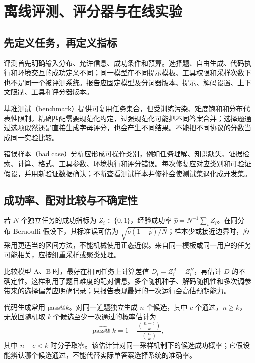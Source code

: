 \setcounter{chapter}{18} %
\chapter{离线评测、评分器与在线实验}
\label{ch:evaluation}

\section{先定义任务，再定义指标}

评测首先明确输入分布、允许信息、成功条件和预算。选择题、自由生成、代码执行和环境交互的成功定义不同；同一模型在不同提示模板、工具权限和采样次数下也不是同一个被评测系统。报告应固定模型及分词器版本、提示、解码设置、上下文限制、工具和评分器版本。

基准测试（benchmark）提供可复用任务集合，但受训练污染、难度饱和和分布代表性限制。精确匹配需要规范化约定，过强规范化可能把不同答案合并；选择题通过选项似然还是直接生成字母评分，也会产生不同结果。不能把不同协议的分数当成同一实验比较。

错误样本（bad case）分析应形成可操作类别，例如任务理解、知识缺失、证据检索、计算、格式、工具参数、环境执行和评分错误。每次修复应对应类别和可验证假设，并用新验证数据确认；不断查看测试样本并修补会使测试集退化成开发集。

\section{成功率、配对比较与不确定性}

若 $N$ 个独立任务的成功指标为 $Z_i\in\{0,1\}$，经验成功率 $\widehat p=N^{-1}\sum_iZ_i$。在同分布 Bernoulli 假设下，其标准误可估为 $\sqrt{\widehat p(1-\widehat p)/N}$；样本少或接近边界时，应采用更适当的区间方法，不能机械使用正态近似。来自同一模板或同一用户的任务可能相关，应按组重采样或聚类处理。

比较模型 A、B 时，最好在相同任务上计算差值 $D_i=Z_i^A-Z_i^B$，再估计 $\overline D$ 的不确定性。这样利用了题目难度的配对信息。多个随机种子、解码随机性和多次调参带来的选择偏差应明确记录；只报告表现最好的一次运行会高估预期能力。

代码生成常用 pass@$k$。对同一道题独立生成 $n$ 个候选，其中 $c$ 个通过，$n\ge k$，无放回随机取 $k$ 个候选至少一次通过的概率估计为
\begin{equation}
\widehat{\operatorname{pass@}k}=1-\frac{\binom{n-c}{k}}{\binom nk},
\label{eq:passk}
\end{equation}
其中 $n-c<k$ 时分子取零。该估计针对同一采样机制下的候选成功概率\cite{humaneval}；它假设能辨认哪个候选通过，不能代替实际单答案选择系统的准确率。

